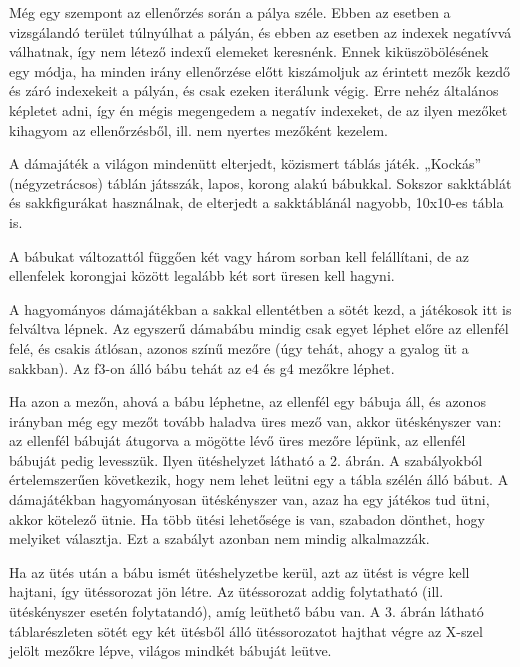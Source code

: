 Még egy szempont az ellenőrzés során a pálya széle. Ebben az esetben a vizsgálandó terület túlnyúlhat a pályán, és ebben az esetben az indexek negatívvá válhatnak, így nem létező indexű elemeket keresnénk. Ennek kiküszöbölésének egy módja, ha minden irány ellenőrzése előtt kiszámoljuk az érintett mezők kezdő és záró indexekeit a pályán, és csak ezeken iterálunk végig. Erre nehéz általános képletet adni, így én mégis megengedem a negatív indexeket, de az ilyen mezőket kihagyom az ellenőrzésből,  ill. nem nyertes mezőként kezelem.




A dámajáték a világon mindenütt elterjedt, közismert táblás játék. „Kockás” (négyzetrácsos) táblán játsszák, lapos, korong alakú bábukkal. Sokszor sakktáblát és sakkfigurákat használnak, de elterjedt a sakktáblánál nagyobb, 10x10-es tábla is.

A bábukat változattól függően két vagy három sorban kell felállítani, de az ellenfelek korongjai között legalább két sort üresen kell hagyni.

A hagyományos dámajátékban a sakkal ellentétben a sötét kezd, a játékosok itt is felváltva lépnek. Az egyszerű dámabábu mindig csak egyet léphet előre az ellenfél felé, és csakis átlósan, azonos színű mezőre (úgy tehát, ahogy a gyalog üt a sakkban). Az f3-on álló bábu tehát az e4 és g4 mezőkre léphet.

Ha azon a mezőn, ahová a bábu léphetne, az ellenfél egy bábuja áll, és azonos irányban még egy mezőt tovább haladva üres mező van, akkor ütéskényszer van: az ellenfél bábuját átugorva a mögötte lévő üres mezőre lépünk, az ellenfél bábuját pedig levesszük. Ilyen ütéshelyzet látható a 2. ábrán. A szabályokból értelemszerűen következik, hogy nem lehet leütni egy a tábla szélén álló bábut. A dámajátékban hagyományosan ütéskényszer van, azaz ha egy játékos tud ütni, akkor kötelező ütnie. Ha több ütési lehetősége is van, szabadon dönthet, hogy melyiket választja. Ezt a szabályt azonban nem mindig alkalmazzák.

Ha az ütés után a bábu ismét ütéshelyzetbe kerül, azt az ütést is végre kell hajtani, így ütéssorozat jön létre. Az ütéssorozat addig folytatható (ill. ütéskényszer esetén folytatandó), amíg leüthető bábu van. A 3. ábrán látható táblarészleten sötét egy két ütésből álló ütéssorozatot hajthat végre az X-szel jelölt mezőkre lépve, világos mindkét bábuját leütve.

